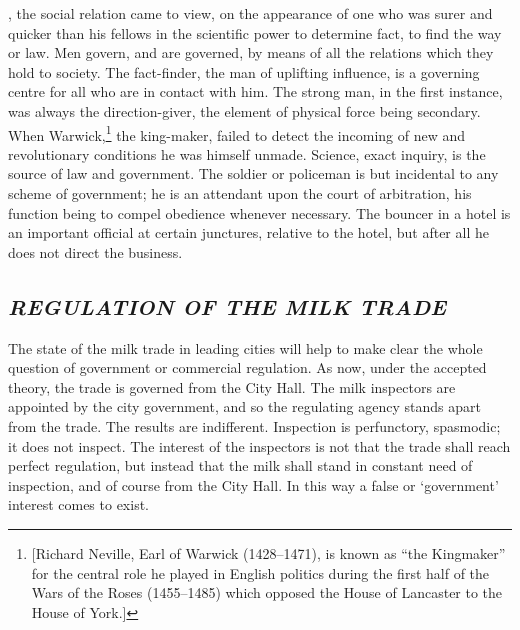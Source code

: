 \documentclass[twoside,symmetric,nobib,justified]{tufte-book}
\begin{document}
\vspace{0.5in}

, the social relation came to view, on the appear­ance of
one who was surer and quicker than his fellows in the scientific power
to determine fact, to find the way or law. Men govern, and are governed,
by means of all the relations which they hold to society. The
fact-finder, the man of uplifting influence, is a governing centre for
all who are in contact with him. The strong man, in the first instance,
was always the direction-giver, the element of physical force being
secondary. When Warwick,\footnote{{[}Richard Neville, Earl of Warwick
  (1428--1471), is known as ``the Kingmaker'' for the central role he
  played in English politics during the first half of the Wars of the
  Roses (1455--1485) which opposed the House of Lancaster to the House
  of York.{]}} the king-maker, failed to detect the incoming of new and
revolutionary conditions he was himself unmade. Science, exact inquiry,
is the source of law and government. The soldier or po­liceman is but
incidental to any scheme of government; he is an attend­ant upon the
court of arbitration, his function being to compel obe­dience whenever
necessary. The bouncer in a hotel is an important of­ficial at certain
junctures, relative to the hotel, but after all he does not direct the
business.

\hypertarget{regulation-0f-the-milk-trade}{%
\subsection{\texorpdfstring{\emph{REGULATION OF THE MILK
TRADE}}{REGULATION 0F THE MILK TRADE}}\label{regulation-0f-the-milk-trade}}

The state of the milk trade in leading cities will help to make clear
the whole question of government or commercial regulation. As now, under
the accepted theory, the trade is governed from the City Hall. The milk
inspectors are appointed by the city government, and so the regulating
agency stands apart from the trade. The results are indifferent.
Inspection is perfunctory, spasmodic; it does not in­spect. The interest
of the inspectors is not that the trade shall reach perfect regulation,
but instead that the milk shall stand in con­stant need of inspection,
and of course from the City Hall. In this way a false or `government'
interest comes to exist.
\end{document}
